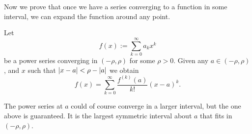 Now we prove that once we have a series converging to a function
in some interval, we can expand the function around any point.

\begin{thm}
\label{thm:tayloranal}
Let
\begin{equation*}
f(x) := \sum_{k=0}^\infty a_k x^k
\end{equation*}
be a power series converging in $(-\rho,\rho)$ for some $\rho > 0$.  Given any $a \in
(-\rho,\rho)$,
and $x$ such that $\lvert {x-a} \rvert < \rho-\lvert {a} \rvert$ we obtain
\begin{equation*}
f(x) =
\sum_{k=0}^\infty \frac{f^{(k)}(a)}{k!} {(x-a)}^{k} .
\end{equation*}
\end{thm}

The power series at $a$ could of course converge in a larger interval, but
the one above is guaranteed.  It is the largest symmetric interval about
$a$ that fits in $(-\rho,\rho)$.

